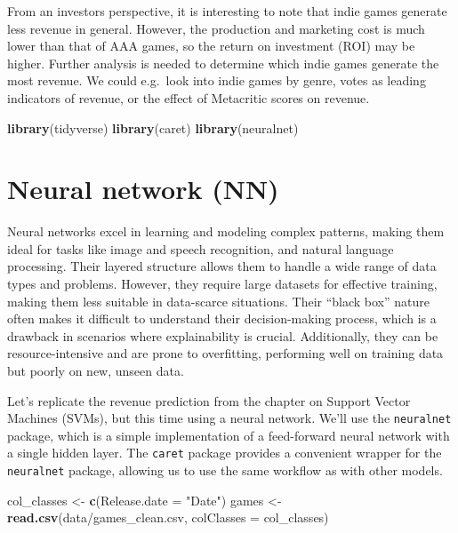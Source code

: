 \documentclass[
]{article}
\newenvironment{Shaded}{\begin{snugshade}}{\end{snugshade}}
\newcommand{\AttributeTok}[1]{\textcolor[rgb]{0.13,0.29,0.53}{#1}}
\newcommand{\FunctionTok}[1]{\textcolor[rgb]{0.13,0.29,0.53}{\textbf{#1}}}
\newcommand{\NormalTok}[1]{#1}
\newcommand{\OtherTok}[1]{\textcolor[rgb]{0.56,0.35,0.01}{#1}}
\newcommand{\StringTok}[1]{\textcolor[rgb]{0.31,0.60,0.02}{#1}}
\begin{document}
From an investors perspective, it is interesting to note that indie
games generate less revenue in general. However, the production and
marketing cost is much lower than that of AAA games, so the return on
investment (ROI) may be higher. Further analysis is needed to determine
which indie games generate the most revenue. We could e.g.~look into
indie games by genre, votes as leading indicators of revenue, or the
effect of Metacritic scores on revenue.

\begin{Shaded}
\begin{Highlighting}[]
\FunctionTok{library}\NormalTok{(tidyverse)}
\FunctionTok{library}\NormalTok{(caret)}
\FunctionTok{library}\NormalTok{(neuralnet)}
\end{Highlighting}
\end{Shaded}

\hypertarget{neural-network-nn}{%
\section{Neural network (NN)}\label{neural-network-nn}}

Neural networks excel in learning and modeling complex patterns, making
them ideal for tasks like image and speech recognition, and natural
language processing. Their layered structure allows them to handle a
wide range of data types and problems. However, they require large
datasets for effective training, making them less suitable in
data-scarce situations. Their ``black box'' nature often makes it
difficult to understand their decision-making process, which is a
drawback in scenarios where explainability is crucial. Additionally,
they can be resource-intensive and are prone to overfitting, performing
well on training data but poorly on new, unseen data.

Let's replicate the revenue prediction from the chapter on Support
Vector Machines (SVMs), but this time using a neural network. We'll use
the \texttt{neuralnet} package, which is a simple implementation of a
feed-forward neural network with a single hidden layer. The
\texttt{caret} package provides a convenient wrapper for the
\texttt{neuralnet} package, allowing us to use the same workflow as with
other models.

\begin{Shaded}
\begin{Highlighting}[]
\NormalTok{col\_classes }\OtherTok{\textless{}{-}} \FunctionTok{c}\NormalTok{(}\AttributeTok{Release.date =} \StringTok{"Date"}\NormalTok{)}
\NormalTok{games }\OtherTok{\textless{}{-}} \FunctionTok{read.csv}\NormalTok{(}\StringTok{\textquotesingle{}data/games\_clean.csv\textquotesingle{}}\NormalTok{, }\AttributeTok{colClasses =}\NormalTok{ col\_classes)}
\end{Highlighting}
\end{Shaded}
\end{document}
